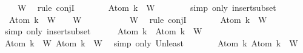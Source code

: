 \begin{isabellebody}
\ {}\ {\isacartoucheopen}{\isacharbraceleft}{\isacharbraceright}\ {\isasymsubseteq}\ W{\isacartoucheclose}\ \isamarkupfalse%
\ {\isacharparenleft}rule\ conjI{\isacharparenright}\isanewline
\ \ \ \ \isamarkupfalse%
\ \isamarkupfalse%
\ {\isachardoublequoteopen}{\isacharbraceleft}Atom\ k{\isacharbraceright}\ {\isasymsubseteq}\ W{\isachardoublequoteclose}\isanewline
\ \ \ \ \ \ \isamarkupfalse%
\ {\isacharparenleft}simp\ only{\isacharcolon}\ insert{\isacharunderscore}subset{\isacharparenright}\isanewline
\ \ \ \ \isamarkupfalse%
\ {\isachardoublequoteopen}\isactrlbold {\isasymnot}\ {\isacharparenleft}Atom\ k{\isacharparenright}\ {\isasymin}\ W\ {\isasymand}\ {\isacharbraceleft}{\isacharbraceright}\ {\isasymsubseteq}\ W{\isachardoublequoteclose}\isanewline
\ \ \ \ \ \ \isamarkupfalse%
\ {}\ {\isacartoucheopen}{\isacharbraceleft}{\isacharbraceright}\ {\isasymsubseteq}\ W{\isacartoucheclose}\ \isamarkupfalse%
\ {\isacharparenleft}rule\ conjI{\isacharparenright}\isanewline
\ \ \ \ \isamarkupfalse%
\ \isamarkupfalse%
\ {\isachardoublequoteopen}{\isacharbraceleft}\isactrlbold {\isasymnot}{\isacharparenleft}Atom\ k{\isacharparenright}{\isacharbraceright}\ {\isasymsubseteq}\ W{\isachardoublequoteclose}\isanewline
\ \ \ \ \ \ \isamarkupfalse%
\ {\isacharparenleft}simp\ only{\isacharcolon}\ insert{\isacharunderscore}subset{\isacharparenright}\isanewline
\ \ \ \ \isamarkupfalse%
\ {\isachardoublequoteopen}{\isacharbraceleft}Atom\ k{\isacharbraceright}\ {\isasymunion}\ {\isacharbraceleft}\isactrlbold {\isasymnot}{\isacharparenleft}Atom\ k{\isacharparenright}{\isacharbraceright}\ {\isasymsubseteq}\ W{\isachardoublequoteclose}\isanewline
\ \ \ \ \ \ \isamarkupfalse%
\ {\isacartoucheopen}{\isacharbraceleft}Atom\ k{\isacharbraceright}\ {\isasymsubseteq}\ W{\isacartoucheclose}\ {\isacartoucheopen}{\isacharbraceleft}\isactrlbold {\isasymnot}{\isacharparenleft}Atom\ k{\isacharparenright}{\isacharbraceright}\ {\isasymsubseteq}\ W{\isacartoucheclose}\ \isamarkupfalse%
\ {\isacharparenleft}simp\ only{\isacharcolon}\ Un{\isacharunderscore}least{\isacharparenright}\isanewline
\ \ \ \ \isamarkupfalse%
\ \isamarkupfalse%
\ {\isachardoublequoteopen}{\isacharbraceleft}Atom\ k{\isacharcomma}\ \isactrlbold {\isasymnot}{\isacharparenleft}Atom\ k{\isacharparenright}{\isacharbraceright}\ {\isasymsubseteq}\ W{\isachardoublequoteclose}\isanewline

\end{isabellebody}
